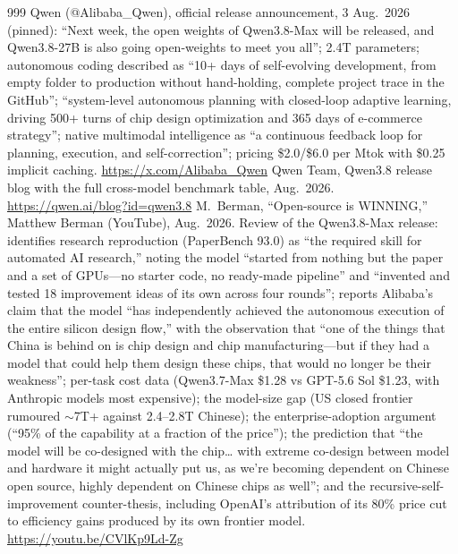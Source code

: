 \begin{thebibliography}{999}
 Qwen (@Alibaba\_Qwen), official release announcement, 3 Aug.\ 2026 (pinned): ``Next week, the open weights of Qwen3.8-Max will be released, and Qwen3.8-27B is also going open-weights to meet you all''; 2.4T parameters; autonomous coding described as ``10+ days of self-evolving development, from empty folder to production without hand-holding, complete project trace in the GitHub''; ``system-level autonomous planning with closed-loop adaptive learning, driving 500+ turns of chip design optimization and 365 days of e-commerce strategy''; native multimodal intelligence as ``a continuous feedback loop for planning, execution, and self-correction''; pricing \$2.0/\$6.0 per Mtok with \$0.25 implicit caching. \url{https://x.com/Alibaba_Qwen}
 Qwen Team, Qwen3.8 release blog with the full cross-model benchmark table, Aug.\ 2026. \url{https://qwen.ai/blog?id=qwen3.8}
 M.~Berman, ``Open-source is WINNING,'' Matthew Berman (YouTube), Aug.\ 2026. Review of the Qwen3.8-Max release: identifies research reproduction (PaperBench 93.0) as ``the required skill for automated AI research,'' noting the model ``started from nothing but the paper and a set of GPUs---no starter code, no ready-made pipeline'' and ``invented and tested 18 improvement ideas of its own across four rounds''; reports Alibaba's claim that the model ``has independently achieved the autonomous execution of the entire silicon design flow,'' with the observation that ``one of the things that China is behind on is chip design and chip manufacturing---but if they had a model that could help them design these chips, that would no longer be their weakness''; per-task cost data (Qwen3.7-Max \$1.28 vs GPT-5.6 Sol \$1.23, with Anthropic models most expensive); the model-size gap (US closed frontier rumoured $\sim$7T+ against 2.4--2.8T Chinese); the enterprise-adoption argument (``95\% of the capability at a fraction of the price''); the prediction that ``the model will be co-designed with the chip\ldots{} with extreme co-design between model and hardware it might actually put us, as we're becoming dependent on Chinese open source, highly dependent on Chinese chips as well''; and the recursive-self-improvement counter-thesis, including OpenAI's attribution of its 80\% price cut to efficiency gains produced by its own frontier model. \url{https://youtu.be/CVlKp9Ld-Zg}


\end{thebibliography}
